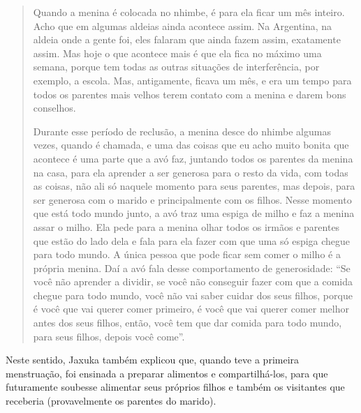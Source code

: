 \begin{quotation}
\noindent
Quando a menina é colocada no nhimbe, é para ela ficar um mês inteiro.
Acho que em algumas aldeias ainda acontece assim. Na Argentina, na
aldeia onde a gente foi, eles falaram que ainda fazem assim, exatamente
assim. Mas hoje o que acontece mais é que ela fica no máximo uma
semana, porque tem todas as outras situações de interferência, por
exemplo, a escola. Mas, antigamente, ficava um mês, e era um tempo para
todos os parentes mais velhos terem contato com a menina e darem bons
conselhos. 

\noindent
Durante esse período de reclusão, a menina desce do nhimbe algumas
vezes, quando é chamada, e uma das coisas que eu acho muito bonita que
acontece é uma parte que a avó faz, juntando todos os parentes da
menina na casa, para ela aprender a ser generosa para o resto da vida,
com todas as coisas, não ali só naquele momento para seus parentes, mas
depois, para ser generosa com o marido e principalmente com os filhos.
Nesse momento que está todo mundo junto, a avó traz uma espiga de milho
e faz a menina assar o milho. Ela pede para a menina olhar todos os
irmãos e parentes que estão do lado dela e fala para ela fazer com que
uma só espiga chegue para todo mundo. A única pessoa que pode ficar sem
comer o milho é a própria menina. Daí a avó fala desse comportamento de
generosidade: ``Se você não aprender a dividir, se você não conseguir
fazer com que a comida chegue para todo mundo, você não vai saber
cuidar dos seus filhos, porque é você que vai querer comer primeiro, é
você que vai querer comer melhor antes dos seus filhos, então, você tem
que dar comida para todo mundo, para seus filhos, depois você come''. 

\end{quotation}
Neste sentido, Jaxuka também explicou que, quando teve a primeira
menstruação, foi ensinada a preparar alimentos e compartilhá-los, para
que futuramente soubesse alimentar seus próprios filhos e também os
visitantes que receberia (provavelmente os parentes do marido).

\bigskip

